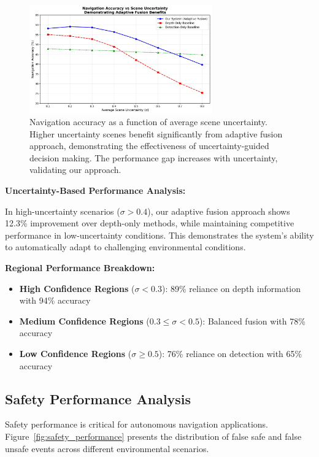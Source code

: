 \documentclass[10pt]{article}
\newcommand{\figref}[1]{Figure~\ref{#1}}
\begin{document}
\begin{figure}[ht]
\centering
\includegraphics[width=0.7\textwidth]{uncertainty_analysis.png}
\caption{Navigation accuracy as a function of average scene uncertainty. Higher uncertainty scenes benefit significantly from adaptive fusion approach, demonstrating the effectiveness of uncertainty-guided decision making. The performance gap increases with uncertainty, validating our approach.}
\label{fig:uncertainty_performance}
\end{figure}

\textbf{Uncertainty-Based Performance Analysis:}

In high-uncertainty scenarios ($\sigma > 0.4$), our adaptive fusion approach shows 12.3\% improvement over depth-only methods, while maintaining competitive performance in low-uncertainty conditions. This demonstrates the system's ability to automatically adapt to challenging environmental conditions.

\textbf{Regional Performance Breakdown:}
\begin{itemize}
\item \textbf{High Confidence Regions} ($\sigma < 0.3$): 89\% reliance on depth information with 94\% accuracy
\item \textbf{Medium Confidence Regions} ($0.3 \leq \sigma < 0.5$): Balanced fusion with 78\% accuracy
\item \textbf{Low Confidence Regions} ($\sigma \geq 0.5$): 76\% reliance on detection with 65\% accuracy
\end{itemize}

\subsection{Safety Performance Analysis}

Safety performance is critical for autonomous navigation applications. \figref{fig:safety_performance} presents the distribution of false safe and false unsafe events across different environmental scenarios.
\end{document}
